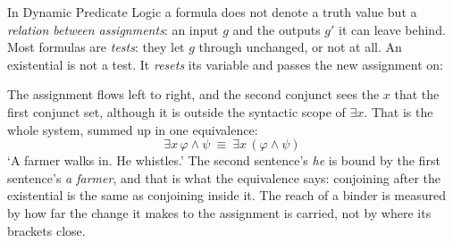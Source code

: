 \documentclass[
  layout=tufte,           %
  twoside=false, open=any,
  font=pagella,
  chapterprefix=false,
  numbers=noendperiod,    %
  headings=optiontohead,  %
  parskip=half-,          %
  colorlinks=true,
  examples=gb4e,
  minsyn=true,            %
  bib=natbib, bibstyle=glossa, bibfile=keio,
  greek=false,
]{gtbook}
\begin{document}
\begin{excursus*}
In Dynamic Predicate Logic \citep{GroenendijkStokhof1991} a formula does not denote a truth value but a \emph{relation between assignments}: an input $g$ and the outputs $g'$ it can leave behind. Most formulas are \emph{tests}: they let $g$ through unchanged, or not at all. An existential is not a test. It \emph{resets} its variable and passes the new assignment on:
\begin{center}
\end{center}
The assignment flows left to right, and the second conjunct sees the $x$ that the first conjunct set, although it is outside the syntactic scope of $\exists x$. That is the whole system, summed up in one equivalence:
\[\exists x\,\varphi \wedge \psi \ \equiv\ \exists x\,(\varphi \wedge \psi)\]
`A farmer walks in. He whistles.' The second sentence's \textit{he} is bound by the first sentence's \textit{a farmer}, and that is what the equivalence says: conjoining after the existential is the same as conjoining inside it. The reach of a binder is measured by how far the change it makes to the assignment is carried, not by where its brackets close.


\end{excursus*}
\end{document}
